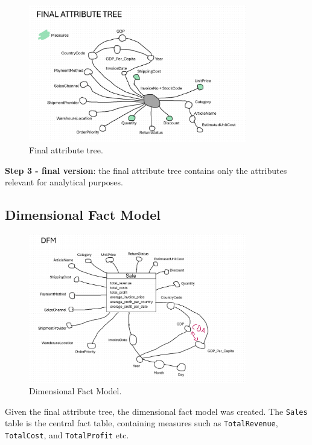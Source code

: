 \documentclass[a4paper,11pt]{article}
\begin{document}
\begin{figure}[H]
\centering
\includegraphics[width=0.85\textwidth]{../Graphs/3_Final_Attribute_Tree.png}
\caption{Final attribute tree.}
\label{fig:final_attribute_tree}
\end{figure}

\textbf{Step 3 - final version}: the final attribute tree contains only the attributes relevant for analytical purposes.

\clearpage

\subsection{Dimensional Fact Model}
\begin{figure}[H]
\centering
\includegraphics[width=0.85\textwidth]{../Graphs/4_Dimensional_Fact_Model.png}
\caption{Dimensional Fact Model.}
\label{fig:dimensional_fact_model}
\end{figure}

Given the final attribute tree, the dimensional fact model was created.
The \texttt{Sales} table is the central fact table, containing measures such as \texttt{TotalRevenue}, \texttt{TotalCost}, and \texttt{TotalProfit} etc.
\end{document}
